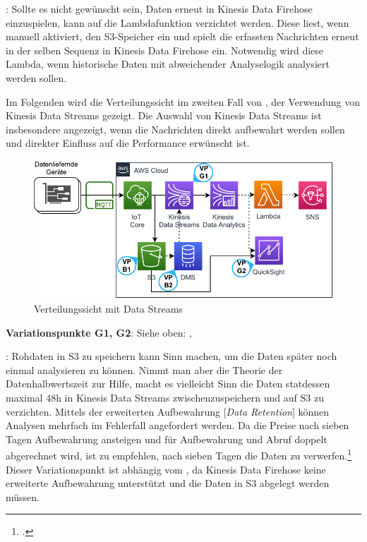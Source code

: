: Sollte es nicht gewünscht sein, Daten erneut in Kinesis Data Firehose einzuspielen, kann auf die Lambdafunktion verzichtet werden. Diese liest, wenn manuell aktiviert, den \ac{S3}-Speicher ein und spielt die erfassten Nachrichten erneut in der selben Sequenz in Kinesis Data Firehose ein. Notwendig wird diese Lambda, wenn historische Daten mit abweichender Analyselogik analysiert werden sollen.

Im Folgenden wird die Verteilungssicht im zweiten Fall von , der Verwendung von Kinesis Data Streams gezeigt. Die Auswahl von Kinesis Data Streams ist insbesondere angezeigt, wenn die Nachrichten direkt aufbewahrt werden sollen und direkter Einfluss auf die Performance erwünscht ist.

\begin{figure}[H]
\centering
\includegraphics[width=\textwidth]{graphics/Echtzeit-RA-Overview.pdf}
\caption{Verteilungssicht mit Data Streams}
\label{abb:TopLevelEchtzeitRAStreams}
\end{figure}

\textbf{Variationspunkte G1, G2}: Siehe oben: , 

: Rohdaten in \ac{S3} zu speichern kann Sinn machen, um die Daten später noch einmal analysieren zu können. Nimmt man aber die Theorie der Datenhalbwertszeit zur Hilfe, macht es vielleicht Sinn die Daten statdessen maximal 48h in Kinesis Data Streams zwischenzuspeichern und auf \ac{S3} zu verzichten. Mittels der erweiterten Aufbewahrung $\lbrack$\textit{Data Retention}$\rbrack$ können Analysen mehrfach im Fehlerfall angefordert werden. Da die Preise nach sieben Tagen Aufbewahrung ansteigen und für Aufbewahrung und Abruf doppelt abgerechnet wird, ist zu empfehlen, nach sieben Tagen die Daten zu verwerfen.\footcite[Vgl.][]{AmazonWebServicesInc..o.J.l} Dieser Variationspunkt ist abhängig vom , da Kinesis Data Firehose keine erweiterte Aufbewahrung unterstützt und die Daten in \ac{S3} abgelegt werden müssen.

